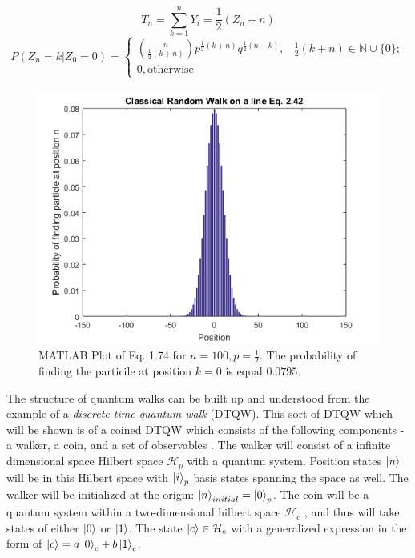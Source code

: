 \begin{equation}
    T_{n} = \sum_{k=1}^{n} Y_{i} = \frac{1}{2}(Z_{n} + n)
 \end{equation}
 \begin{equation}
     P(Z_{n} = k | Z_{0} = 0) = 
     \begin{cases}
     \binom{n}{\frac{1}{2}(k+n)} p^{\frac{1}{2}(k+n)}q^{\frac{1}{2}(n-k)}, & \frac{1}{2}(k+n) \in \mathbb{N} \cup \{0\}; \\
     0, \text{otherwise} 
     \end{cases}
 \end{equation}
  \begin{figure}[H]
     \centering
     \includegraphics[scale=0.6]{1_Intro/Figures/classical_walk.png}
     \caption{MATLAB Plot of Eq. 1.74 for $n = 100, p = \frac{1}{2}$. The probability of finding the particile at position $k = 0$ is equal $0.0795$.}
     \label{fig:my_label}
 \end{figure}
 The structure of quantum walks can be built up and understood from the example of a \textit{discrete time quantum walk} (DTQW). This sort of DTQW which will be shown is of a coined DTQW which consists of the following components - a walker, a coin, and a set of observables \cite{Venegas-Andraca2012}. The walker will consist of a infinite dimensional space Hilbert space $\mathcal{H}_{p}$ with a quantum system. Position states $\ket{n}$ will be in this Hilbert space with $\ket{i}_{p}$ basis states spanning the space as well. The walker will be initialized at the origin: $\ket{n}_{initial}=\ket{0}_{p}$. The coin will be a quantum system within a two-dimensional hilbert space $\mathcal{H}_{c}$ , and thus will take states of either $\ket{0}$ or $\ket{1}$. The state $\ket{c} \in \mathcal{H}_{c}$ with a generalized expression in the form of $\ket{c} = a\ket{0}_{c} + b \ket{1}_{c}$. \newline
